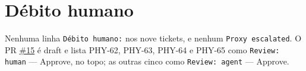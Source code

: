\documentclass[11pt,a4paper]{article}
\begin{document}
\section{Débito humano}

Nenhuma linha \texttt{Débito humano:} nos nove tickets, e nenhum
\texttt{Proxy escalated}. O PR
\href{https://github.com/Laginho/PhysiSyst/pull/15}{\#15} é draft e lista PHY-62,
PHY-63, PHY-64 e PHY-65 como \texttt{Review: human} --- Approve, no topo; as
outras cinco como \texttt{Review: agent} --- Approve.
\end{document}
